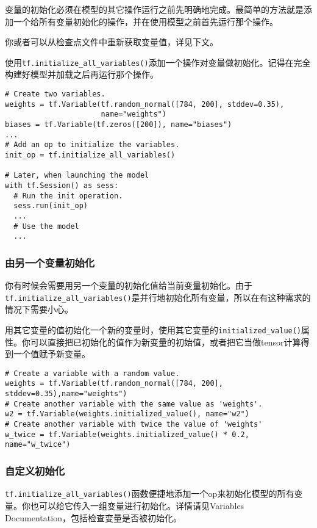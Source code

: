 变量的初始化必须在模型的其它操作运行之前先明确地完成。最简单的方法就是添加一个给所有变量初始化的操作，并在使用模型之前首先运行那个操作。

你或者可以从检查点文件中重新获取变量值，详见下文。

使用\lstinline{tf.initialize_all_variables()}添加一个操作对变量做初始化。记得在完全构建好模型并加载之后再运行那个操作。

\begin{lstlisting}
# Create two variables.
weights = tf.Variable(tf.random_normal([784, 200], stddev=0.35),
                      name="weights")
biases = tf.Variable(tf.zeros([200]), name="biases")
...
# Add an op to initialize the variables.
init_op = tf.initialize_all_variables()

# Later, when launching the model
with tf.Session() as sess:
  # Run the init operation.
  sess.run(init_op)
  ...
  # Use the model
  ...
\end{lstlisting}

\subsubsection{由另一个变量初始化}
你有时候会需要用另一个变量的初始化值给当前变量初始化。由于\lstinline{tf.initialize_all_variables()}是并行地初始化所有变量，所以在有这种需求的情况下需要小心。

用其它变量的值初始化一个新的变量时，使用其它变量的\lstinline{initialized_value()}属性。你可以直接把已初始化的值作为新变量的初始值，或者把它当做tensor计算得到一个值赋予新变量。

\begin{lstlisting}
# Create a variable with a random value.
weights = tf.Variable(tf.random_normal([784, 200], stddev=0.35),name="weights")
# Create another variable with the same value as 'weights'.
w2 = tf.Variable(weights.initialized_value(), name="w2")
# Create another variable with twice the value of 'weights'
w_twice = tf.Variable(weights.initialized_value() * 0.2, name="w_twice")
\end{lstlisting}

\subsubsection{自定义初始化}

\lstinline{tf.initialize_all_variables()}函数便捷地添加一个op来初始化模型的所有变量。你也可以给它传入一组变量进行初始化。详情请见Variables Documentation，包括检查变量是否被初始化。

